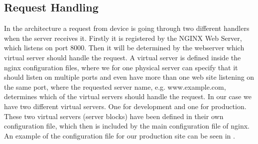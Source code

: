 \subsection{Request Handling}
\label{sub:request_handling}
In the architecture a request from device is going through two different handlers when the server receives it. Firstly it is registered by the NGINX Web Server, which listens on port 8000. Then it will be determined by the webserver which virtual server should handle the request. A virtual server is defined inside the nginx configuration files, where we for one physical server can specify that it should listen on multiple ports and even have more than one web site listening on the same port, where the requested server name, e.g. www.example.com, determines which of the virtual servers should handle the request. In our case we have two different virtual servers. One for development and one for production. These two virtual servers (server blocks) have been defined in their own configuration file, which then is included by the main configuration file of nginx. An example of the configuration file for our production site can be seen in . 


\FloatBarrier

